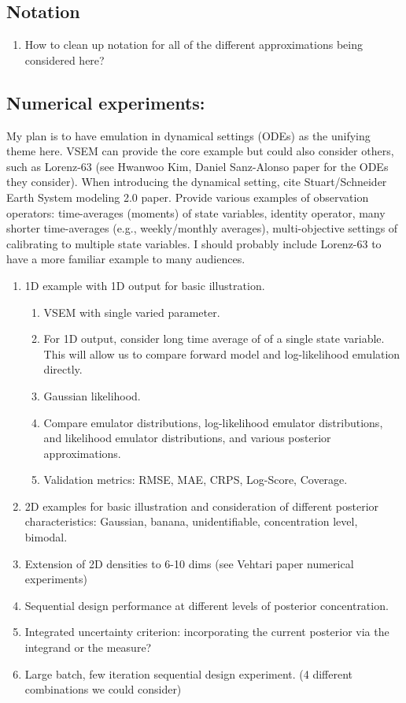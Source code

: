 \documentclass[12pt]{article}
\begin{document}
\subsection{Notation}
\begin{enumerate}
\item How to clean up notation for all of the different approximations being considered here? 
\end{enumerate}

\subsection{Numerical experiments:}
My plan is to have emulation in dynamical settings (ODEs) as the unifying theme here. VSEM can provide the core example but could also consider 
others, such as Lorenz-63 (see Hwanwoo Kim, Daniel Sanz-Alonso paper for the ODEs they consider). When introducing the dynamical setting,
cite Stuart/Schneider Earth System modeling 2.0 paper. Provide various examples of observation operators: time-averages (moments) of state 
variables, identity operator, many shorter time-averages (e.g., weekly/monthly averages), multi-objective settings of calibrating to multiple state 
variables. I should probably include Lorenz-63 to have a more familiar example to many audiences. 

\begin{enumerate}
\item 1D example with 1D output for basic illustration. 
	\begin{enumerate}
	\item VSEM with single varied parameter. 
	\item For 1D output, consider long time average of of a single state variable. This will allow us to compare forward model and log-likelihood emulation directly.
	\item Gaussian likelihood. 
	\item Compare emulator distributions, log-likelihood emulator distributions, and likelihood emulator distributions, and various posterior approximations. 
	\item Validation metrics: RMSE, MAE, CRPS, Log-Score, Coverage. 
	\end{enumerate}
\item 2D examples for basic illustration and consideration of different posterior characteristics: Gaussian, banana, unidentifiable, concentration level, bimodal. 
\item Extension of 2D densities to 6-10 dims (see Vehtari paper numerical experiments) 
\item Sequential design performance at different levels of posterior concentration. 
\item Integrated uncertainty criterion: incorporating the current posterior via the integrand or the measure?
\item Large batch, few iteration sequential design experiment. 
(4 different combinations we could consider) 
\end{enumerate}
\end{document}
